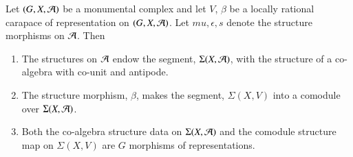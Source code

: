 \begin{prop}\label{art6-proposition-13.2}
Let $(G, X, \mathcal{A})$ be a monumental complex and let $V$, $\beta$ be a locally rational carapace of representation on $(G, X, \mathcal{A})$. Let $mu, \epsilon, s$ denote the structure morphisms on $\mathcal{A}$. Then
\begin{enumerate}[(1)]
\item The structures on $\mathcal{A}$ endow the segment, $\Sigma(X, \mathcal{A})$, with the structure of a co-algebra with co-unit and antipode.\label{art6-proposition13.2-enum-1}

\item The structure morphism, $\beta$, makes the segment, $\Sigma(X, V)$ into a comodule
 over $\Sigma(X, \mathcal{A})$.\label{art6-proposition13.2-enum-2}

 \item Both the co-algebra structure data on $\Sigma(X, \mathcal{A})$ and the comodule structure map on $\Sigma(X, V)$ are $G$ morphisms of representations.\label{art6-proposition13.2-enum-3}
\end{enumerate}
\end{prop}

